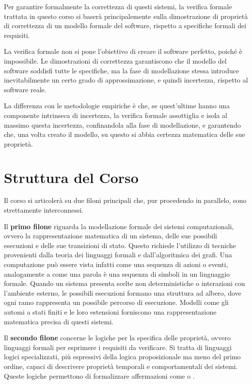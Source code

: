 Per garantire formalmente la correttezza di questi sistemi, la verifica formale trattata in questo corso si baserà principalemente sulla dimostrazione di proprietà di correttezza di un modello formale del software, rispetto a specifiche formali dei requisiti.
\begin{note}{}
  La verifica formale non si pone l'obiettivo di creare il software perfetto, poiché è impossibile.
  Le dimostrazioni di correttezza garantiscono che il modello del software soddisfi tutte le specifiche, ma la fase di modellazione stessa introduce inevitabilmente un certo grado di approssimazione, e quindi incertezza, rispetto al software reale.

  La differenza con le metodologie empiriche è che, se quest'ultime hanno una componente intrinseca di incertezza, la verifica formale assottiglia e isola al massimo questa incertezza, confinandola alla fase di modellazione, e garantendo che, una volta creato il modello, su questo si abbia certezza matematica delle sue proprietà.
\end{note}

\section{Struttura del Corso}

Il corso si articolerà su due filoni principali che, pur procedendo in parallelo, sono strettamente interconnessi.

Il \textbf{primo filone} riguarda la modellazione formale dei sistemi computazionali, ovvero la rappresentazione matematica di un sistema, delle sue possibili esecuzioni e delle sue transizioni di stato.
Questo richiede l'utilizzo di tecniche provenienti dalla teoria dei linguaggi formali e dall'algoritmica dei grafi.
Una computazione può essere vista infatti come una sequenza di azioni o eventi, analogamente a come una parola è una sequenza di simboli in un linguaggio formale.
Quando un sistema presenta scelte non deterministiche o interazioni con l'ambiente esterno, le possibili esecuzioni formano una struttura ad albero, dove ogni ramo rappresenta un possibile percorso di esecuzione.
Modelli come gli automi a stati finiti e le loro estensioni forniscono una rappresentazione matematica precisa di questi sistemi.

Il \textbf{secondo filone} concerne le logiche per la specifica delle proprietà, ovvero linguaggi formali per esprimere i requisiti da verificare.
Si tratta di linguaggi logici specializzati, più espressivi della logica proposizionale ma meno del primo ordine, capaci di descrivere proprietà temporali e comportamentali dei sistemi.
Queste logiche permettono di formalizzare affermazioni come  o .


